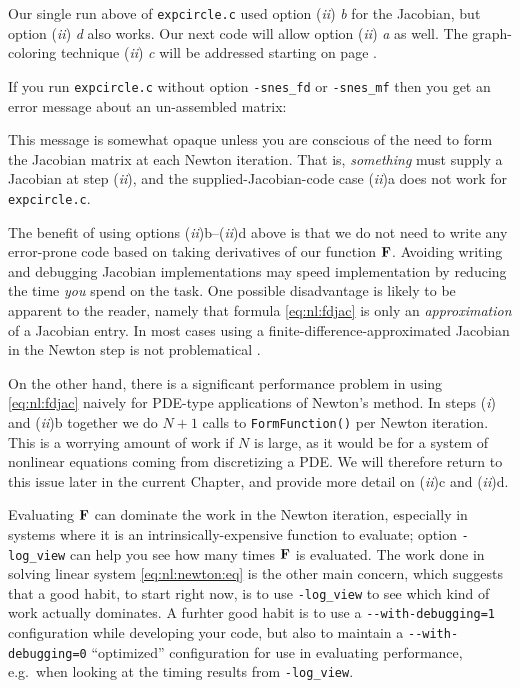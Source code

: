 Our single run above of \texttt{expcircle.c} used option (\emph{ii}) \emph{b} for the Jacobian, but option (\emph{ii}) \emph{d} also works.  Our next code will allow option (\emph{ii}) \emph{a} as well.  The graph-coloring technique (\emph{ii}) \emph{c} will be addressed starting on page \pageref{sec:nl:coloring}.

If you run \texttt{expcircle.c} without option \texttt{-snes\_fd} or \texttt{-snes\_mf} then you get an error message about an un-assembled matrix:
This message is somewhat opaque unless you are conscious of the need to form the Jacobian matrix at each Newton iteration.  That is, \emph{something} must supply a Jacobian at step (\emph{ii}), and the supplied-Jacobian-code case (\emph{ii})a does not work for \texttt{expcircle.c}.

The benefit of using options (\emph{ii})b--(\emph{ii})d above is that we do not need to write any error-prone code based on taking derivatives of our function $\mathbf{F}$.  Avoiding writing and debugging Jacobian implementations may speed implementation by reducing the time \emph{you} spend on the task.  One possible disadvantage is likely to be apparent to the reader, namely that formula \eqref{eq:nl:fdjac} is only an \emph{approximation} of a Jacobian entry.  In most cases using a finite-difference-approximated Jacobian in the Newton step is not problematical \citep{Kelley2003}.

On the other hand, there is a significant performance problem in using \eqref{eq:nl:fdjac} naively for PDE-type applications of Newton's method.  In steps (\emph{i}) and (\emph{ii})b together we do $N+1$ calls to \texttt{FormFunction()} per Newton iteration.  This is a worrying amount of work if $N$ is large, as it would be for a system of nonlinear equations coming from discretizing a PDE.  We will therefore return to this issue later in the current Chapter, and provide more detail on (\emph{ii})c and (\emph{ii})d.

Evaluating $\mathbf{F}$ can dominate the work in the Newton iteration, especially in systems where it is an intrinsically-expensive function to evaluate; \PETSc option \texttt{-log\_view} can help you see how many times $\mathbf{F}$ is evaluated.  The work done in solving linear system \eqref{eq:nl:newton:eq} is the other main concern, which suggests that a good habit, to start right now, is to use \texttt{-log\_view} to see which kind of work actually dominates.  A furhter good habit is to use a \verb|--with-debugging=1| \PETSc configuration while developing your code, but also to maintain a \verb|--with-debugging=0| ``optimized'' configuration for use in evaluating performance, e.g.~when looking at the timing results from \texttt{-log\_view}.


